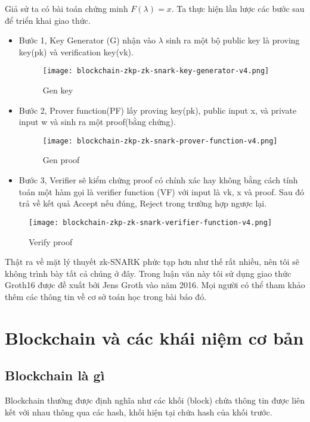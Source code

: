 \documentclass[../thesis.tex]{subfiles}
\begin{document}
Giả sử ta có bài toán chứng minh $F(\lambda) = x$. Ta thực hiện lần lược các bước sau để triển khai giao thức.
\begin{itemize}
\item Bước 1, Key Generator (G) nhận vào $\lambda$ sinh ra một bộ public key là proving key(pk) và verification key(vk). 
\begin{figure}[H]
   \centering
   \texttt{[image: blockchain-zkp-zk-snark-key-generator-v4.png]}
   \caption{Gen key \cite{altoros}}
\end{figure}
\item Bước 2, Prover function(PF) lấy proving key(pk), public input x, và private input w và sinh ra một proof(bằng chứng). 
\begin{figure}[H]
   \centering
   \texttt{[image: blockchain-zkp-zk-snark-prover-function-v4.png]}
   \caption{Gen proof \cite{altoros}}
\end{figure}
\item Bước 3, Verifier sẽ kiểm chứng proof có chính xác hay không bằng cách tính toán một hàm gọi là verifier function (VF) với input là vk, x và proof. Sau đó trả về kết quả Accept nếu đúng, Reject trong trường hợp ngược lại.
\end{itemize}
\begin{figure}[H]
   \centering
   \texttt{[image: blockchain-zkp-zk-snark-verifier-function-v4.png]}
   \caption{Verify proof \cite{altoros}}
\end{figure}

Thật ra về mặt lý thuyết zk-SNARK phức tạp hơn như thế rất nhiều, nên tôi sẽ không trình bày tất cả chúng ở đây. Trong luận văn này tôi sử dụng giao thức Groth16 \cite{cryptoeprint:2016:260} được đề xuất bởi Jens Groth vào năm 2016. Mọi người có thể tham khảo thêm các thông tin về cơ sở toán học trong bài báo đó.

\section{Blockchain và các khái niệm cơ bản}
\subsection{Blockchain là gì}

Blockchain thường được định nghĩa như các khối (block) chứa thông tin được liên kết với nhau thông qua các hash, khối hiện tại chứa hash của khối trước. 
\end{document}
